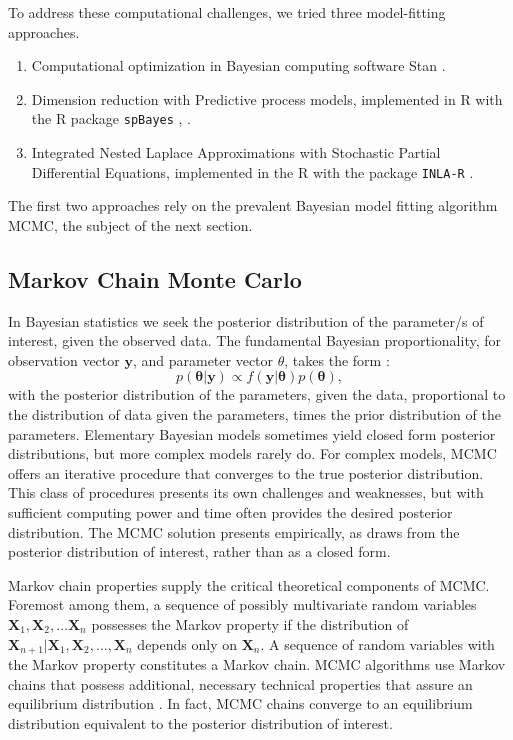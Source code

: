To address these computational challenges, we tried three model-fitting approaches.
\begin{enumerate}
\item Computational optimization in Bayesian computing software Stan \citep{RSTAN}.
\item Dimension reduction with Predictive process models, implemented in R with the R package \verb|spBayes| \citep{Eidsvik2012}, \citep{Finley2013}.
\item Integrated Nested Laplace Approximations with Stochastic Partial Differential Equations, implemented in the R with the package \verb|INLA-R| \citep{Lindgren2015}.
\end{enumerate}
The first two approaches rely on the prevalent Bayesian model fitting algorithm  MCMC, the subject of the next section.

\subsection{Markov Chain Monte Carlo}

In Bayesian statistics we seek the posterior distribution of the parameter/s of interest, given the observed data. The fundamental Bayesian proportionality, for observation vector $\pmb{y}$, and parameter vector $\theta$, takes the form \citep{Gelman2014}:
\begin{equation} \label{eq:bayes}
p(\pmb{\theta}|\pmb{y}) \propto f(\pmb{y}|\pmb{\theta})p(\pmb{\theta}),
\end{equation}
with the posterior distribution of the parameters, given the data, proportional to the distribution of data given the parameters, times the prior distribution of the parameters. Elementary Bayesian models sometimes yield closed form posterior distributions, but more complex models rarely do. For complex models, MCMC offers an iterative procedure that converges to the true posterior distribution. This class of procedures presents its own challenges and weaknesses, but with sufficient computing power and time often provides the desired posterior distribution. The MCMC solution presents empirically, as draws from the posterior distribution of interest, rather than as a closed form. 

Markov chain properties supply the critical theoretical components of MCMC. Foremost among them, a sequence of possibly multivariate random variables $\pmb{X}_{1}, \pmb{X}_{2}, \hdots \pmb{X}_{n}$ possesses the Markov property if the distribution of $\pmb{X}_{n+1}|\pmb{X}_{1}, \pmb{X}_{2}, \hdots , \pmb{X}_{n}$ depends only on $\pmb{X}_{n}$. A sequence of random variables with the Markov property constitutes a Markov chain. MCMC algorithms use Markov chains that possess additional, necessary technical properties that assure an equilibrium distribution \citep{Brooks2011}. In fact, MCMC chains converge to an equilibrium distribution equivalent to the posterior distribution of interest.

